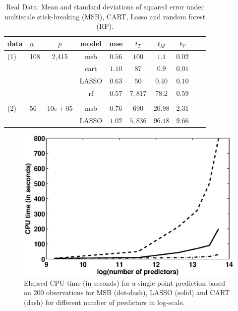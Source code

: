 \begin{table}[t]
\caption{Real Data: Mean and standard deviations of squared error under multiscale stick-breaking (MSB), CART, Lasso and random forest (RF).}\label{real}
\vskip 0.15in
\begin{center}
\begin{small}
\begin{sc}
\begin{tabular}{llcccccccc}
\hline
data &$n$&$p$ &model&mse&$t_{T}$ & $t_{M}$ & $t_{V}$\\
\hline
(1)&108&2,415&msb &$0.56$ & $100$ & $1.1$& $0.02$\\
 &&& cart & $1.10$ & $87$ & $0.9$ &$0.01$\\
&&& LASSO & $0.63$  & $50$ & $0.40$ & $0.10$\\
&&& rf & $0.57$ &  $7,817$ & $78.2$ & $0.59$\\
\\
  (2)&56&$10e+05$&msb &$0.76$ & $690$ & $20.98$& $2.31$\\
 &&& LASSO & $1.02$  & $5,836$ & $96.18$ & $9.66$\\
\hline
\end{tabular}
\end{sc}
\end{small}
\end{center}
\vskip -0.1in
\end{table}


\nocite{langley00}



\begin{figure}[h!]
\centering
\includegraphics[width=0.8\linewidth]{plotCPU.eps}
\caption{Elapsed CPU time (in seconds) for a single point prediction based on $200$ observations for MSB (dot-dash), LASSO (solid) and CART (dash) for different number of predictors in log-scale.} \label{Cpu}
\end{figure}

